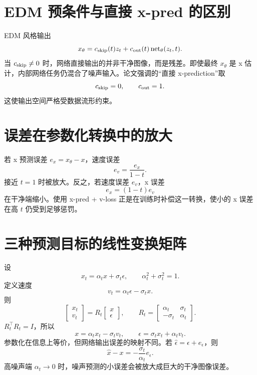 \documentclass[UTF8,12pt,a4paper,fontset=none]{ctexart}
\numberwithin{equation}{section}
\begin{document}
\section{EDM 预条件与直接 x-pred 的区别}
EDM 风格输出
\begin{equation}
 x_\theta=c_{\rm skip}(t)z_t+c_{\rm out}(t)\operatorname{net}_\theta(z_t,t).
\end{equation}
当 $c_{\rm skip}\ne0$ 时，网络直接输出的并非干净图像，而是残差。即使最终 $x_\theta$ 是 x 估计，内部网络任务仍混合了噪声输入。论文强调的“直接 x-prediction”取
\begin{equation}
 c_{\rm skip}=0,\qquad c_{\rm out}=1.
\end{equation}
这使输出空间严格受数据流形约束。

\section{误差在参数化转换中的放大}
若 x 预测误差 $e_x=x_\theta-x$，速度误差
\begin{equation}
 e_v=\frac{e_x}{1-t}.
\end{equation}
接近 $t=1$ 时被放大。反之，若速度误差 $e_v$，x 误差
\begin{equation}
 e_x=(1-t)e_v
\end{equation}
在干净端缩小。使用 x-pred + v-loss 正是在训练时补偿这一转换，使小的 x 误差在高 $t$ 仍受到足够惩罚。

\section{三种预测目标的线性变换矩阵}
设
\begin{equation}
 x_t=\alpha_t x+\sigma_t\epsilon,
 \qquad \alpha_t^2+\sigma_t^2=1.
\end{equation}
定义速度
\begin{equation}
 v_t=\alpha_t\epsilon-\sigma_tx.
\end{equation}
则
\begin{equation}
 \begin{bmatrix}x_t\\v_t\end{bmatrix}
 =R_t\begin{bmatrix}x\\\epsilon\end{bmatrix},
 \qquad
 R_t=\begin{bmatrix}\alpha_t&\sigma_t\\-\sigma_t&\alpha_t\end{bmatrix}.
\end{equation}
$R_t^\top R_t=I$，所以
\begin{equation}
 x=\alpha_tx_t-\sigma_tv_t,
 \qquad
 \epsilon=\sigma_tx_t+\alpha_tv_t.
\end{equation}
参数化在信息上等价，但网络输出误差的映射不同。若 $\widehat\epsilon=\epsilon+e_\epsilon$，则
\begin{equation}
 \widehat x-x=-\frac{\sigma_t}{\alpha_t}e_\epsilon.
\end{equation}
高噪声端 $\alpha_t\to0$ 时，噪声预测的小误差会被放大成巨大的干净图像误差。
\end{document}
